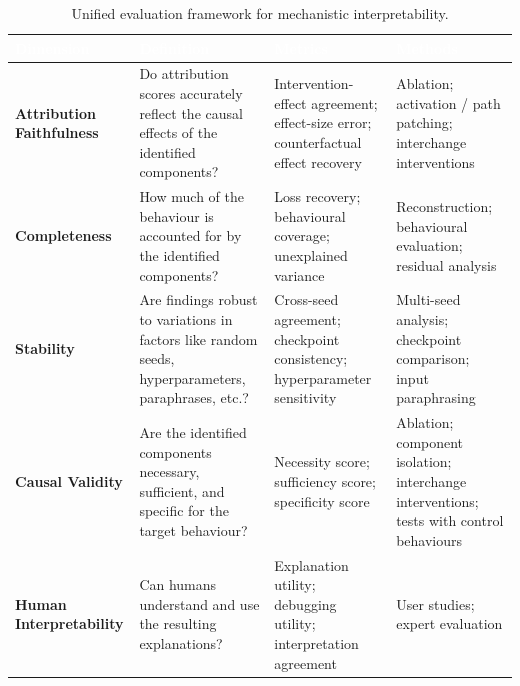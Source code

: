 \begin{table}[tb]
\centering
\caption{Unified evaluation framework for mechanistic interpretability.}
\label{tab:evaluation-framework}
\renewcommand{\arraystretch}{1.4}
\begin{tabular}{
>{\raggedright\arraybackslash}p{2.8cm}
>{\raggedright\arraybackslash}p{4.3cm}
>{\raggedright\arraybackslash}p{4.3cm}
>{\raggedright\arraybackslash}p{3.3cm}}
\toprule
\rowcolor{tableheader!80}
\textcolor{white}{\textbf{Dimension}} &
\textcolor{white}{\textbf{Definition}} &
\textcolor{white}{\textbf{Metrics}} &
\textcolor{white}{\textbf{Methods}} \\
\midrule

\rowcolor{tablerow1}
\textbf{Attribution Faithfulness} &
Do attribution scores accurately reflect the causal effects of the identified components? &
Intervention-effect agreement; effect-size error; counterfactual effect recovery &
Ablation; activation / path patching; interchange interventions \\

\rowcolor{tablerow2}
\textbf{Completeness} &
How much of the behaviour is accounted for by the identified components? &
Loss recovery; behavioural coverage; unexplained variance &
Reconstruction; behavioural evaluation; residual analysis \\

\rowcolor{tablerow1}
\textbf{Stability} &
Are findings robust to variations in factors like random seeds, hyperparameters, paraphrases, etc.? &
Cross-seed agreement; checkpoint consistency; hyperparameter sensitivity &
Multi-seed analysis; checkpoint comparison; input paraphrasing\\

\rowcolor{tablerow2}
\textbf{Causal Validity} &
Are the identified components necessary, sufficient, and specific for the target behaviour? &
Necessity score; sufficiency score; specificity score&
Ablation; component isolation; interchange interventions; tests with control behaviours \\

\rowcolor{tablerow1}
\textbf{Human Interpretability} &
Can humans understand and use the resulting explanations? &
Explanation utility; debugging utility; interpretation agreement &
User studies; expert evaluation\\

\bottomrule
\end{tabular}
\end{table}

